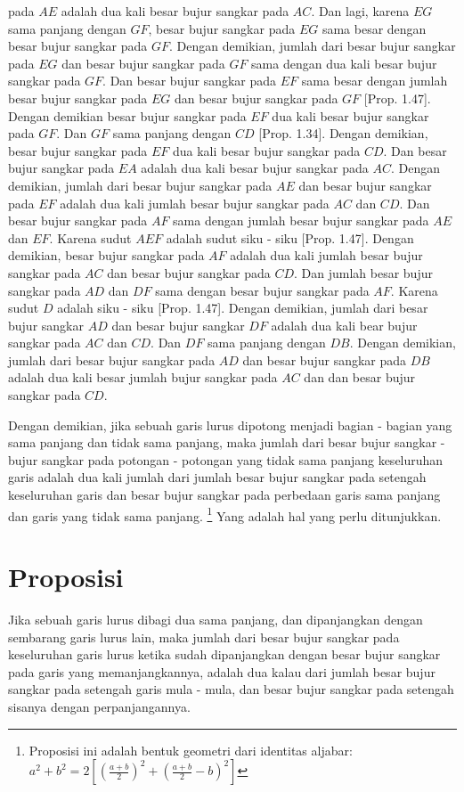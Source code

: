\documentclass[a4paper]{book}
\begin{document}
pada $AE$ adalah dua kali besar bujur sangkar pada $AC$. Dan lagi, karena $EG$
sama panjang dengan $GF$, besar bujur sangkar pada $EG$ sama besar dengan besar
bujur sangkar pada $GF$. Dengan demikian, jumlah dari besar bujur sangkar
pada $EG$ dan besar bujur sangkar pada $GF$ sama dengan dua kali besar bujur
sangkar pada $GF$. Dan besar bujur sangkar pada $EF$ sama besar dengan jumlah
besar bujur sangkar pada $EG$ dan besar bujur sangkar pada $GF$ [Prop. 1.47].
Dengan demikian besar bujur sangkar pada $EF$ dua kali besar bujur sangkar 
pada $GF$. Dan $GF$ sama panjang dengan $CD$ [Prop. 1.34]. Dengan demikian,
besar bujur sangkar pada $EF$ dua kali besar bujur sangkar pada $CD$.
Dan besar bujur sangkar pada $EA$ adalah dua kali besar bujur sangkar pada $AC$.
Dengan demikian, jumlah dari besar bujur sangkar pada $AE$ dan besar bujur sangkar
pada $EF$ adalah dua kali jumlah besar bujur sangkar pada $AC$ dan $CD$. 
Dan besar bujur sangkar pada $AF$ sama dengan jumlah besar bujur sangkar
pada $AE$ dan $EF$. Karena sudut $AEF$ adalah sudut siku - siku [Prop. 1.47].
Dengan demikian, besar bujur sangkar pada $AF$ adalah dua kali jumlah besar
bujur sangkar pada $AC$ dan besar bujur sangkar pada $CD$. Dan jumlah besar
bujur sangkar pada $AD$ dan $DF$ sama dengan besar bujur sangkar pada $AF$.
Karena sudut $D$ adalah siku - siku [Prop. 1.47]. Dengan demikian, jumlah
dari besar bujur sangkar $AD$ dan besar bujur sangkar $DF$ adalah dua kali
bear bujur sangkar pada $AC$ dan $CD$. Dan $DF$ sama panjang dengan $DB$. 
Dengan demikian, jumlah dari besar bujur sangkar pada $AD$ dan besar bujur 
sangkar pada $DB$ adalah dua kali besar jumlah bujur sangkar pada $AC$ dan 
dan besar bujur sangkar pada $CD$.

Dengan demikian, jika sebuah garis lurus dipotong menjadi bagian - bagian 
yang sama panjang dan tidak
sama panjang, maka jumlah dari besar bujur sangkar - bujur sangkar pada 
potongan - potongan yang
tidak sama panjang keseluruhan garis adalah dua kali jumlah dari jumlah besar
bujur sangkar pada setengah keseluruhan garis dan besar bujur sangkar pada
perbedaan garis sama panjang dan garis yang tidak sama panjang. \footnote{Proposisi 
ini adalah bentuk geometri dari identitas aljabar: $a^2 + b^2 = 2[(\frac{a+b}{2})^2 + (\frac{a+b}{2} - b)^2]$}
Yang adalah hal yang perlu ditunjukkan.  

\section*{\centering Proposisi \thesection} 
Jika sebuah garis lurus dibagi dua sama panjang, dan dipanjangkan dengan
sembarang garis lurus lain, maka jumlah dari besar bujur sangkar pada 
keseluruhan garis lurus ketika sudah dipanjangkan dengan besar bujur
sangkar pada garis yang memanjangkannya, adalah dua kalau dari jumlah besar
bujur sangkar pada setengah garis mula - mula, dan besar bujur sangkar
pada setengah sisanya dengan perpanjangannya.
\end{document}
